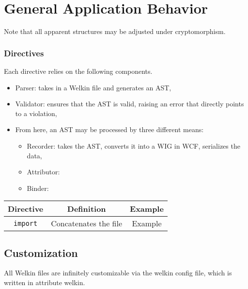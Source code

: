 \section{General Application Behavior}

Note that all apparent structures may be adjusted under cryptomorphism.
\subsubsection*{Directives}
Each directive relies on the following components.
\begin{itemize}
  \item Parser: takes in a Welkin file and generates an AST,
  \item Validator: ensures that the AST is valid, raising an error that directly points to a violation,
  \item From here, an AST may be processed by three different means:
		\begin{itemize}
		  \item Recorder: takes the AST, converts it into a WIG in WCF, serializes the data,
		  \item Attributor: %
		  \item Binder:
		\end{itemize}
\end{itemize}
\begin{center}
  \begin{tabular}{| c | c | c |}
	Directive & Definition & Example \\
	\hline
	\texttt{import} & Concatenates the file & Example

  \end{tabular}
\end{center}




\subsection{Customization}
All Welkin files are infinitely customizable via the welkin config file, which is written in attribute welkin.

